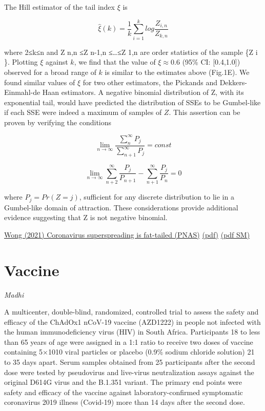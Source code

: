 \documentclass[
]{book}
\begin{document}
The Hill estimator of the tail index \(ξ\) is

\[\hat{ξ}(k) = \frac{1}{k} \sum_{i=1}^{k} log \frac{Z_{i,n}}{Z_{k,n}}\]

where 2≤k≤n and Z n,n ≤Z n-1,n ≤\ldots≤Z 1,n are order statistics of the sample \{Z i \}. Plotting \(ξ\) against \(k\), we find
that the value of \(ξ ≈0.6\) (95\% CI: {[}0.4,1.0{]}) observed for a broad range of \(k\) is similar to the estimates
above (Fig.1E).
We found similar values of \(ξ\) for two other estimators, the Pickands and
Dekkers-Einmahl-de Haan estimators.
A negative binomial distribution of Z, with its exponential tail, would have
predicted the distribution of SSEs to be Gumbel-like if each SSE were indeed
a maximum of samples of \(Z\).
This assertion can be proven by verifying the conditions

\[\underset{n\to \infty}{\lim} \frac{\sum_{n}^{\infty} P_{j}}{\sum_{n+1}^{\infty} P_{j}} = const\]

\[\underset{n\to \infty}{\lim} \sum_{n+2}^{\infty} \frac{P_{j}}{P_{n+1}}-\sum_{n+1}^{\infty}\frac{P_{j}}{P_{n}}= 0\]

where \(P_{j} =Pr(Z=j)\), sufficient for any discrete distribution to lie in a Gumbel-like domain of attraction.
These considerations provide additional evidence suggesting that Z is not negative binomial.

\href{coronavirus\%20superspreading\%20is\%20fat-tailed}{Wong (2021) Coronavirus superspreading is fat-tailed (PNAS)}
\href{pdf/Wong_2021_Corona_Superspreader_Fat-tailed.pdf}{(pdf)}
\href{pdf/Wong_2021_Corona_Superspreader_Fat-tailed_SM.pdf}{(pdf SM)}

\hypertarget{vaccine}{%
\chapter{Vaccine}\label{vaccine}}

\emph{Madhi}

A multicenter, double-blind, randomized, controlled trial to assess the safety and efficacy of the ChAdOx1 nCoV-19 vaccine (AZD1222) in people not infected with the human immunodeficiency virus (HIV) in South Africa. Participants 18 to less than 65 years of age were assigned in a 1:1 ratio to receive two doses of vaccine containing 5×1010 viral particles or placebo (0.9\% sodium chloride solution) 21 to 35 days apart. Serum samples obtained from 25 participants after the second dose were tested by pseudovirus and live-virus neutralization assays against the original D614G virus and the B.1.351 variant. The primary end points were safety and efficacy of the vaccine against laboratory-confirmed symptomatic coronavirus 2019 illness (Covid-19) more than 14 days after the second dose.
\end{document}
